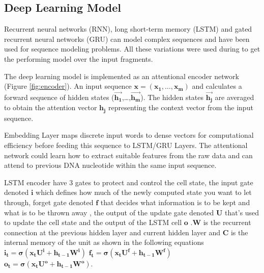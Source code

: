 \documentclass[conference]{IEEEtran}
\begin{document}

\subsection{Deep Learning Model}
Recurrent neural networks (RNN), long short-term memory (LSTM) \cite{hochreiter1997long} and gated recurrent neural networks (GRU) \cite{chung2014empirical} can model complex sequences and have been used for sequence modeling problems. All these variations were used during to get the performing model over the input fragments. 

The deep learning model is implemented as an attentional encoder network (Figure \ref{fig:encoder}). An input sequence  $\mathbf{x = (x_{1} , \ldots{} , x_{m} )}$  and calculates a forward sequence of hidden states  ($\mathbf{\overrightarrow{h_{1}}}$,\ldots{},$\mathbf{ \overrightarrow{h_{m}}}$). The hidden states $\mathbf{\overrightarrow{h_{j}}}$  are averaged to obtain the attention vector $\mathbf{h_{j}}$ representing the context vector from the input sequence.

Embedding Layer maps discrete input words to dense vectors for computational efficiency before feeding this sequence to LSTM/GRU Layers. The attentional network could learn how to extract suitable features from the raw data and can attend to previous DNA nucleotide within the same input sequence. 

LSTM encoder have 3 gates to protect and control the cell state, the input gate denoted $\mathbf{i}$ which defines how much of the newly computed state you want to let through, forget gate denoted $\mathbf{f}$ that decides what information is to be kept and what is to be thrown away ,  the output of the update gate denoted $\mathbf{U}$ that's used to update the cell state and the output of the LSTM cell $\mathbf{o}$ .$\mathbf{W}$ is the recurrent connection at the previous hidden layer and current hidden layer and $\mathbf{C}$ is the internal memory of the unit  as shown in the following equations \newline
$\mathbf{i_{t}=\sigma(x_{t}U^i + h_{t-1}W^i)}$ \newline
$\mathbf{f_{t}=\sigma(x_{t}U^f + h_{t-1}W^f)}$ \newline
$\mathbf{o_{t}=\sigma(x_{t}U^o + h_{t-1}W^o)}$. 
\end{document}
